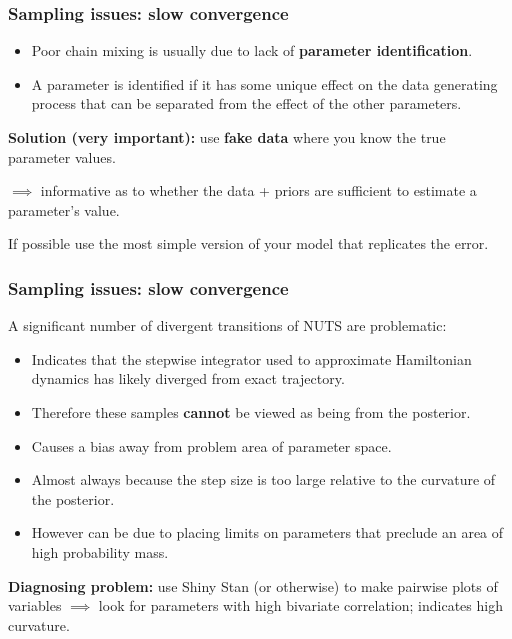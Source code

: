 \documentclass[handout]{beamer}
\begin{document}
\begin{frame}
	\frametitle{Sampling issues: slow convergence}
    \begin{itemize}
    	\item<2-> Poor chain mixing is usually due to lack of \textbf{parameter identification}.
    	\item<3-> A parameter is identified if it has some unique effect on the data generating process that can be separated from the effect of the other parameters.
    \end{itemize}
    
    \textbf{Solution (very important):} use \textbf{fake data} where you know the true parameter values.
    
    \vspace{0.2cm}
    
    $\implies$ informative as to whether the data + priors are sufficient to estimate a parameter's value.
    
     If possible use the most simple version of your model that replicates the error.
    
\end{frame}

\begin{frame}
	\frametitle{Sampling issues: slow convergence}
	 A significant number of divergent transitions of NUTS are problematic:
	\begin{itemize}
		\item<3-> Indicates that the stepwise integrator used to approximate Hamiltonian dynamics has likely diverged from exact trajectory.
		\item<4-> Therefore these samples \textbf{cannot} be viewed as being from the posterior.
		\item<5-> Causes a bias away from problem area of parameter space.
		\item<6-> Almost always because the step size is too large relative to the curvature of the posterior.
		\item<7-> However can be due to placing limits on parameters that preclude an area of high probability mass. 
	\end{itemize}
	
	\textbf{Diagnosing problem:} use Shiny Stan (or otherwise) to make pairwise plots of variables $\implies$ look for parameters with high bivariate correlation; indicates high curvature.

\end{frame}
\end{document}
